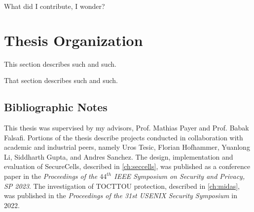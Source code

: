 What did I contribute, I wonder?

\section{Thesis Organization}

This section describes such and such.

That section describes such and such.

\subsection{Bibliographic Notes}
This thesis was supervised by my advisors, Prof. Mathias Payer and Prof. Babak Falsafi.
Portions of the thesis describe projects conducted in collaboration with academic and
industrial peers, namely Uros Tesic, Florian Hofhammer, Yuanlong Li, Siddharth Gupta, 
and Andres Sanchez.
The design, implementation and evaluation of SecureCells, described in 
\autoref{ch:seccells}, was published as a conference paper in the 
\emph{Proceedings of the $44^{th}$ IEEE Symposium on Security and Privacy, SP 2023}.
The investigation of TOCTTOU protection, described in \autoref{ch:midas},
was published in the
\emph{Proceedings of the 31st USENIX Security Symposium} in 2022.

